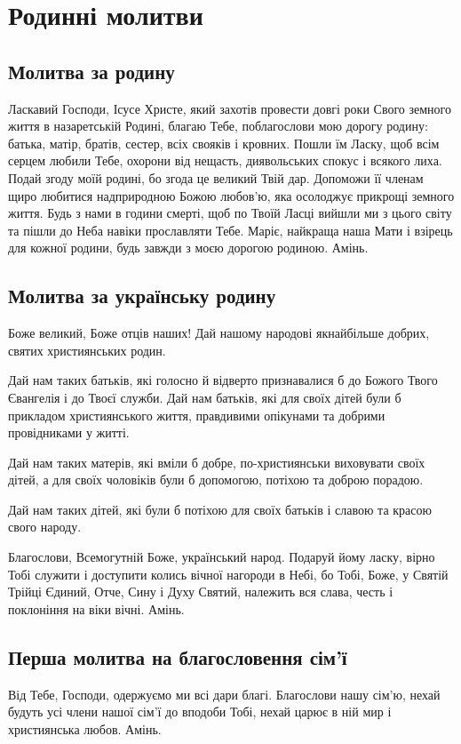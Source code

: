 \documentclass[chapters.tex]{subfiles}
\begin{document}
\chapter{Родинні молитви}
\section{Молитва за родину}
Ласкавий Господи, Ісусе Христе, який захотів провести довгі роки Свого земного життя в назаретській Родині, благаю Тебе, поблагослови мою дорогу родину: батька, матір, братів, сестер, всіх свояків і кровних. Пошли їм Ласку, щоб всім серцем любили Тебе, охорони від нещасть, диявольських спокус і всякого лиха. Подай згоду моїй родині, бо згода це великий Твій дар. Допоможи її членам щиро любитися надприродною Божою любов’ю, яка осолоджує прикрощі земного життя. Будь з нами в години смерті, щоб по Твоїй Ласці вийшли ми з цього світу та пішли до Неба навіки прославляти Тебе. Маріє, найкраща наша Мати і взірець для кожної родини, будь завжди з моєю дорогою родиною. Амінь.

\section{Молитва за українську родину}
Боже великий, Боже отців наших! Дай нашому народові якнайбільше добрих, святих християнських родин.

Дай нам таких батьків, які голосно й відверто признавалися б до Божого Твого Євангелія і до Твоєї служби. Дай нам батьків, які для своїх дітей були б прикладом християнського життя, правдивими опікунами та добрими провідниками у житті.

Дай нам таких матерів, які вміли б добре, по-християнськи виховувати своїх дітей, а для своїх чоловіків були б допомогою, потіхою та доброю порадою.

Дай нам таких дітей, які були б потіхою для своїх батьків і славою та красою свого народу.

Благослови, Всемогутній Боже, український народ. Подаруй йому ласку, вірно Тобі служити і доступити колись вічної нагороди в Небі, бо Тобі, Боже, у Святій Трійці Єдиний, Отче, Сину і Духу Святий, належить вся слава, честь і поклоніння на віки вічні. Амінь.

\section{Перша молитва на благословення сім’ї}
Від Тебе, Господи, одержуємо ми всі дари благі. Благослови нашу сім’ю, нехай будуть усі члени нашої сім’ї до вподоби Тобі, нехай царює в ній мир і християнська любов. Амінь.
\end{document}
